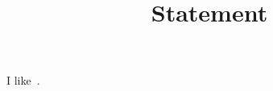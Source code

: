\documentclass{article}
\begin{document}
\title{Statement}
\maketitle

I like~\cite{Guy20}.

{}

\end{document}
